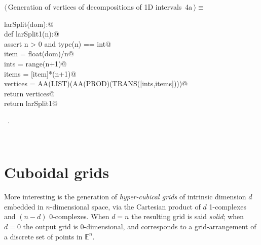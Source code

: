 \documentclass[11pt,oneside]{article}	%
\def\E{\mathbb{E}}
\begin{document}
\begin{flushleft} \small
\begin{minipage}{\linewidth} \label{scrap4}
\protect{}$\langle\,$Generation of vertices of decompositions of 1D intervals\nobreak\ {\footnotesize 4a}$\,\rangle\equiv$
\vspace{-1ex}
\begin{list}{}{} \item
\mbox{}\verb@def larSplit(dom):@\\
\mbox{}\verb@    def larSplit1(n):@\\
\mbox{}\verb@        assert n > 0 and type(n) == int@\\
\mbox{}\verb@        item = float(dom)/n@\\
\mbox{}\verb@        ints = range(n+1)@\\
\mbox{}\verb@        items = [item]*(n+1)@\\
\mbox{}\verb@        vertices = AA(LIST)(AA(PROD)(TRANS([ints,items])))@\\
\mbox{}\verb@        return vertices@\\
\mbox{}\verb@    return larSplit1@\\
\mbox{}\verb@@{\NWsep}
\end{list}
\vspace{-1ex}
\footnotesize\addtolength{\baselineskip}{-1ex}
\begin{list}{}{\setlength{\itemsep}{-\parsep}\setlength{\itemindent}{-\leftmargin}}
\item \NWtxtMacroRefIn\ .
\end{list}
\end{minipage}\\[4ex]
\end{flushleft}


\section{Cuboidal grids}
\label{sec:cuboids}

More interesting is the generation of \emph{hyper-cubical grids} of intrinsic dimension $d$ embedded in $n$-dimensional space, via the Cartesian product of $d$ 1-complexes and $(n-d)$ 0-complexes. When $d=n$ the resulting grid is said \emph{solid}; when $d=0$ the output grid is 0-dimensional, and corresponds to a grid-arrangement of a discrete set of points in $\E^n$.
\end{document}
